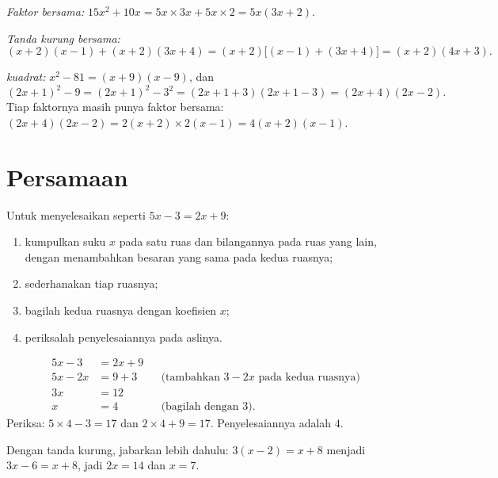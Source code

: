\begin{example}\label{ex:g9:algebra:factor}
\emph{Faktor bersama:}
$15x^2 + 10x = 5x \times 3x + 5x \times 2 = 5x(3x + 2)$.

\emph{Tanda kurung bersama:}
\[
(x+2)(x-1) + (x+2)(3x+4) = (x+2)\bigl[(x-1) + (3x+4)\bigr]
= (x+2)(4x+3).
\]

\emph{ kuadrat:}
$x^2 - 81 = (x+9)(x-9)$, dan
\[
(2x+1)^2 - 9 = (2x+1)^2 - 3^2 = (2x+1+3)(2x+1-3) = (2x+4)(2x-2).
\]
Tiap faktornya masih punya faktor bersama: $(2x+4)(2x-2) = 2(x+2)
\times 2(x-1) = 4(x+2)(x-1)$.
\end{example}

\section{Persamaan}

\begin{method}\label{met:g9:algebra:firstdegree}
Untuk menyelesaikan  seperti $5x - 3 = 2x + 9$:
\begin{enumerate}
  \item kumpulkan suku $x$ pada satu ruas dan bilangannya pada ruas
        yang lain, dengan menambahkan besaran yang sama pada kedua
        ruasnya;
  \item sederhanakan tiap ruasnya;
  \item bagilah kedua ruasnya dengan koefisien $x$;
  \item periksalah penyelesaiannya pada  aslinya.
\end{enumerate}
\end{method}

\begin{example}\label{ex:g9:algebra:firstdegree}
\begin{align*}
5x - 3 &= 2x + 9 \\
5x - 2x &= 9 + 3 && \text{(tambahkan $3 - 2x$ pada kedua ruasnya)}\\
3x &= 12 \\
x &= 4 && \text{(bagilah dengan 3).}
\end{align*}
Periksa: $5 \times 4 - 3 = 17$ dan $2 \times 4 + 9 = 17$.
Penyelesaiannya adalah $4$.

Dengan tanda kurung, jabarkan lebih dahulu: $3(x - 2) = x + 8$ menjadi
$3x - 6 = x + 8$, jadi $2x = 14$ dan $x = 7$.
\end{example}

